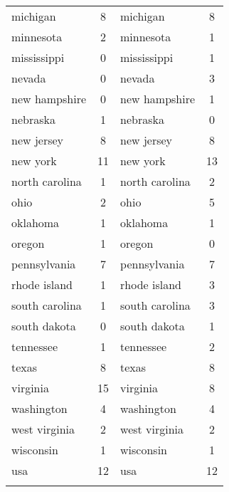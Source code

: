 \begin{longtable}{lclc}
michigan             & 8            & michigan             & 8            \\
minnesota            & 2            & minnesota            & 1            \\
mississippi          & 0            & mississippi          & 1            \\
nevada               & 0            & nevada               & 3            \\
new hampshire        & 0            & new hampshire        & 1            \\
nebraska             & 1            & nebraska             & 0            \\
new jersey           & 8            & new jersey           & 8            \\
new york             & 11           & new york             & 13           \\
north carolina       & 1            & north carolina       & 2            \\
ohio                 & 2            & ohio                 & 5            \\
oklahoma             & 1            & oklahoma             & 1            \\
oregon               & 1            & oregon               & 0            \\
pennsylvania         & 7            & pennsylvania         & 7            \\
rhode island         & 1            & rhode island         & 3            \\
south carolina       & 1            & south carolina       & 3            \\
south dakota         & 0            & south dakota         & 1    \\
tennessee            & 1            & tennessee            & 2            \\
texas                & 8            & texas                & 8            \\
virginia             & 15           & virginia             & 8            \\
washington           & 4            & washington           & 4            \\
west virginia        & 2            & west virginia        & 2            \\
wisconsin            & 1            & wisconsin            & 1            \\
usa                  & 12           & usa                  & 12           \\
\hline       
\label{table:bp2}
\end{longtable}
\figSpace

